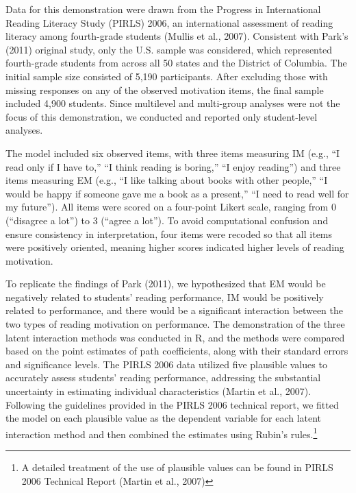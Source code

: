\documentclass[
  man]{apa6}
\begin{document}
Data for this demonstration were drawn from the Progress in International Reading Literacy Study (PIRLS) 2006, an international assessment of reading literacy among fourth-grade students (Mullis et al., 2007). Consistent with Park's (2011) original study, only the U.S. sample was considered, which represented fourth-grade students from across all 50 states and the District of Columbia. The initial sample size consisted of 5,190 participants. After excluding those with missing responses on any of the observed motivation items, the final sample included 4,900 students. Since multilevel and multi-group analyses were not the focus of this demonstration, we conducted and reported only student-level analyses.

The model included six observed items, with three items measuring IM (e.g., ``I read only if I have to,'' ``I think reading is boring,'' ``I enjoy reading'') and three items measuring EM (e.g., ``I like talking about books with other people,'' ``I would be happy if someone gave me a book as a present,'' ``I need to read well for my future''). All items were scored on a four-point Likert scale, ranging from 0 (``disagree a lot'') to 3 (``agree a lot''). To avoid computational confusion and ensure consistency in interpretation, four items were recoded so that all items were positively oriented, meaning higher scores indicated higher levels of reading motivation.

To replicate the findings of Park (2011), we hypothesized that EM would be negatively related to students' reading performance, IM would be positively related to performance, and there would be a significant interaction between the two types of reading motivation on performance. The demonstration of the three latent interaction methods was conducted in R, and the methods were compared based on the point estimates of path coefficients, along with their standard errors and significance levels. The PIRLS 2006 data utilized five plausible values to accurately assess students' reading performance, addressing the substantial uncertainty in estimating individual characteristics (Martin et al., 2007). Following the guidelines provided in the PIRLS 2006 technical report, we fitted the model on each plausible value as the dependent variable for each latent interaction method and then combined the estimates using Rubin's rules.\footnote{A detailed treatment of the use of plausible values can be found in PIRLS 2006 Technical Report (Martin et al., 2007)}
\end{document}
